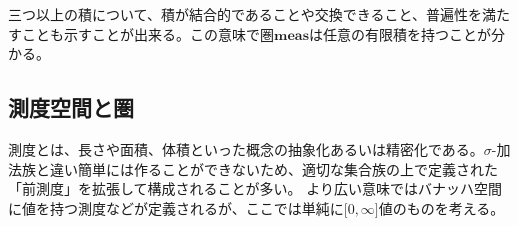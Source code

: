 \documentclass[../root.tex]{subfiles}
\begin{document}
三つ以上の積について、積が結合的であることや交換できること、普遍性を満たすことも示すことが出来る。この意味で圏$ \mathbf{meas} $は任意の有限積を持つことが分かる。

\begin{comment}生成と積の関係は次の命題が便利である。
\begin{Prop}{}{}
$ \mathscr{G}\subset 2^{S}, \mathscr{H}\subset 2^{T} $に対し、
$ \sigma\lbrack \mathscr{G} \rbrack\otimes\sigma\lbrack \mathscr{H} \rbrack = \sigma\lbrack \mathscr{G}\times T\cup S\times\mathscr{H} \rbrack $が成り立つ。
\end{Prop}

\begin{proof}
（証明）
\[ \sigma\lbrack \mathscr{G} \rbrack\times T\cup S\times\sigma\lbrack \mathscr{H} \rbrack \supset \mathscr{G}\times T\cup S\times\mathscr{H} \]
である。故に生成すれば最小性から
\[ \sigma\lbrack \mathscr{G} \rbrack\otimes\sigma\lbrack \mathscr{H} \rbrack \supset \sigma\lbrack \mathscr{G}\times T\cup S\times\mathscr{H} \rbrack \]
が従う。逆を示すために$ \sigma\lbrack \mathscr{G} \rbrack\times T\subset\sigma\lbrack \mathscr{G}\times T \rbrack $を示す。
射影$ \mathrm{proj}\colon S\times T\rightarrow S $を考えれば
\begin{align*}
\mathrm{proj}\left( \sigma\lbrack \mathscr{G}\times T \rbrack \right) &= \left\lbrace A\subset S : A\times T\in\sigma\lbrack \mathscr{G}\times T \rbrack \right\rbrace \\
&\supset \lbrace A\subset S : A\times T\in\mathscr{G}\times T \rbrace = \mathscr{G}
\end{align*}
となる。故に最小性より$ \mathrm{proj}\left( \sigma\lbrack \mathscr{G}\times T \rbrack \right)\supset\sigma\lbrack \mathscr{G} \rbrack $を得る。つまり
\[ \sigma\lbrack \mathscr{G} \rbrack\times T\subset\sigma\lbrack \mathscr{G}\times T \rbrack\subset\sigma\lbrack \mathscr{G}\times T\cup S\times\mathscr{H} \rbrack \]
が従う。$ S\times\sigma\lbrack \mathscr{H} \rbrack $についても同様だから、
\[ \sigma\lbrack \mathscr{G} \rbrack\times T\cup S\times\sigma\lbrack \mathscr{H} \rbrack \subset \sigma\lbrack \mathscr{G}\times T\cup S\times\mathscr{H} \rbrack \]
が分かる。故に最小性より$ \sigma\lbrack \mathscr{G} \rbrack\otimes\sigma\lbrack \mathscr{H} \rbrack \subset \sigma\lbrack \mathscr{G}\times T\cup S\times\mathscr{H} \rbrack $が従う。$ \square $
\end{proof}\end{comment}




\subsection{測度空間と圏}
測度とは、長さや面積、体積といった概念の抽象化あるいは精密化である。$ \sigma $-加法族と違い簡単には作ることができないため、適切な集合族の上で定義された「前測度」を拡張して構成されることが多い。
より広い意味ではバナッハ空間に値を持つ測度などが定義されるが、ここでは単純に$ \lbrack 0, \infty \rbrack $値のものを考える。
\end{document}
